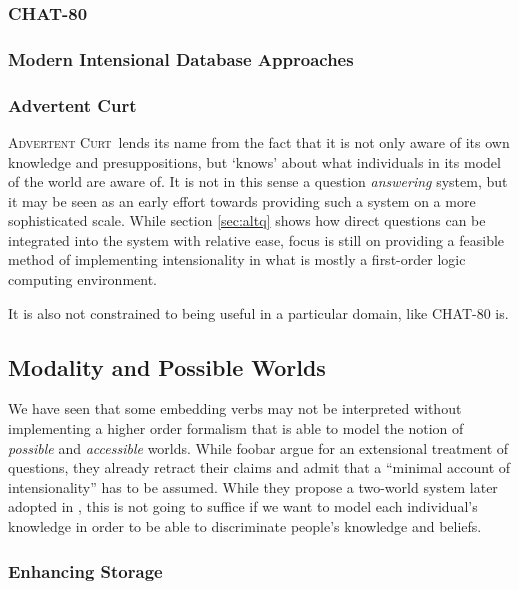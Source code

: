 \documentclass[a4paper]{article}
\newcommand{\pn}{\textsc} %
\newcommand{\acurt}{\pn{Advertent Curt}\mbox{ }}
\begin{document}
\subsubsection{CHAT-80}

\subsubsection{Modern Intensional Database Approaches}

\subsubsection{Advertent Curt}

\acurt lends its name from the fact that it is not only aware of its own
knowledge and presuppositions, but `knows' about what individuals in its
model of the world are aware of. It is not in this sense a question
\emph{answering} system, but it may be seen as an early effort towards providing
such a system on a more sophisticated scale. While section \ref{sec:altq} shows
how direct questions can be integrated into the system with relative ease, focus
is still on providing a feasible method of implementing intensionality in what
is mostly a first-order logic computing environment.

It is also not constrained to being useful in a particular domain, like
\pn{CHAT-80} is.

\subsection{Modality and Possible Worlds}
\label{sec:indices}

We have seen that some embedding verbs may not be interpreted without
implementing a higher order formalism that is able to model the notion of
\emph{possible} and \emph{accessible} worlds. While foobar %
argue for an extensional treatment of questions, they already %
retract their claims and admit that a ``minimal account of intensionality'' has
to be assumed. While they propose a two-world system later adopted in
\cite{g:is}, this is not going to suffice if we want to model each individual's
knowledge in order to be able to discriminate people's knowledge and beliefs.

\subsubsection{Enhancing Storage}
\end{document}
